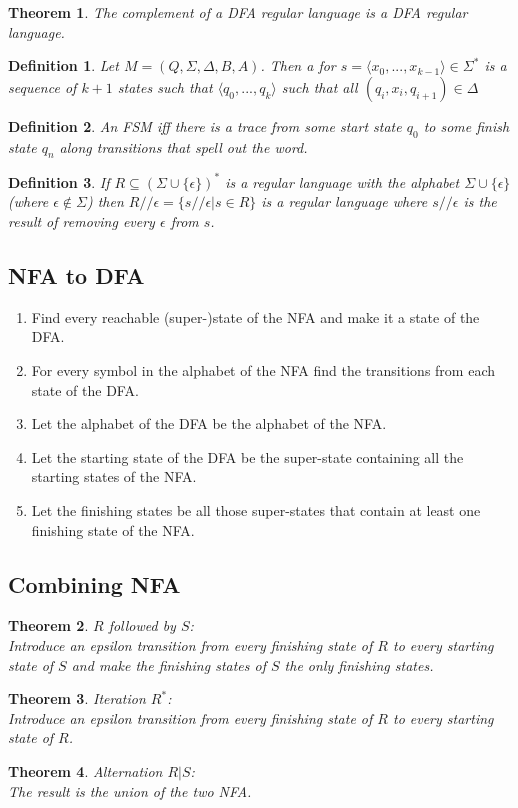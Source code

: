 \documentclass{article}
\theoremstyle{sltheorem}
\newtheorem{definition}{Definition}
\newtheorem{theorem}{Theorem}
\begin{document}
\begin{theorem}
    The complement of a DFA regular language is a DFA regular language.
\end{theorem}
\begin{definition}
    Let $M=(Q,\Sigma,\Delta,B,A)$. Then a  for $s=\langle x_0,...,x_{k-1}\rangle\in\Sigma^*$ is a sequence of $k+1$ states such that $\langle q_0, ...,q_k\rangle$ such that all $(q_i,x_i,q_{i+1})\in\Delta$
\end{definition}
\begin{definition}
    An FSM  iff there is a trace from some start state $q_0$ to some finish state $q_n$ along transitions that spell out the word.
\end{definition}
\begin{definition}
    If $R\subseteq(\Sigma\cup\{\epsilon\})^*$ is a regular language with the alphabet $\Sigma\cup\{\epsilon\}$ (where $\epsilon\not\in\Sigma$) then $R//\epsilon=\{s//\epsilon|s\in R\}$ is a regular language where $s//\epsilon$ is the result of removing every $\epsilon$ from $s$.
\end{definition}
\subsection{NFA to DFA}
\begin{enumerate}
    \item Find every reachable (super-)state of the NFA and make it a state of the DFA.
    \item For every symbol in the alphabet of the NFA find the transitions from each state of the DFA.
    \item Let the alphabet of the DFA be the alphabet of the NFA.
    \item Let the starting state of the DFA be the super-state containing all the starting states of the NFA.
    \item Let the finishing states be all those super-states that contain at least one finishing state of the NFA.
\end{enumerate}
\subsection{Combining NFA}
\begin{theorem}
    $R$ followed by $S$:\\
    Introduce an epsilon transition from every finishing state of $R$ to every starting state of $S$ and make the finishing states of $S$ the only finishing states.
\end{theorem}
\begin{theorem}
    Iteration $R^*$:\\
    Introduce an epsilon transition from every finishing state of $R$ to every starting state of $R$.
\end{theorem}
\begin{theorem}
    Alternation $R|S$:\\
    The result is the union of the two NFA.
\end{theorem}
\end{document}
